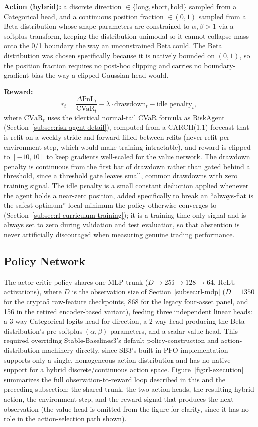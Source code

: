 \textbf{Action (hybrid):} a discrete direction $\in \{\text{long}, \text{short}, \text{hold}\}$ sampled from a Categorical head, and a continuous position fraction $\in (0,1)$ sampled from a Beta distribution whose shape parameters are constrained to $\alpha,\beta > 1$ via a softplus transform, keeping the distribution unimodal so it cannot collapse mass onto the 0/1 boundary the way an unconstrained Beta could. The Beta distribution was chosen specifically because it is natively bounded on $(0,1)$, so the position fraction requires no post-hoc clipping and carries no boundary-gradient bias the way a clipped Gaussian head would.

\textbf{Reward:}
\[
r_t = \frac{\Delta \mathrm{PnL}_t}{\mathrm{CVaR}_t} - \lambda \cdot \mathrm{drawdown}_t - \mathrm{idle\_penalty}_t,
\]
where $\mathrm{CVaR}_t$ uses the identical normal-tail CVaR formula as RiskAgent (Section~\ref{subsec:risk-agent-detail}), computed from a GARCH(1,1) forecast that is refit on a weekly stride and forward-filled between refits (never refit per environment step, which would make training intractable), and reward is clipped to $[-10, 10]$ to keep gradients well-scaled for the value network. The drawdown penalty is continuous from the first bar of drawdown rather than gated behind a threshold, since a threshold gate leaves small, common drawdowns with zero training signal. The idle penalty is a small constant deduction applied whenever the agent holds a near-zero position, added specifically to break an ``always-flat is the safest optimum'' local minimum the policy otherwise converges to (Section~\ref{subsec:rl-curriculum-training}); it is a training-time-only signal and is always set to zero during validation and test evaluation, so that abstention is never artificially discouraged when measuring genuine trading performance.

\subsection{Policy Network}
\label{subsec:rl-policy}

The actor-critic policy shares one MLP trunk ($D \to 256 \to 128 \to 64$, ReLU activations), where $D$ is the observation size of Section~\ref{subsec:rl-mdp} ($D=1350$ for the crypto5 raw-feature checkpoints, 868 for the legacy four-asset panel, and 156 in the retired encoder-based variant), feeding three independent linear heads: a 3-way Categorical logits head for direction, a 2-way head producing the Beta distribution's pre-softplus $(\alpha, \beta)$ parameters, and a scalar value head. This required overriding Stable-Baselines3's default policy-construction and action-distribution machinery directly, since SB3's built-in PPO implementation supports only a single, homogeneous action distribution and has no native support for a hybrid discrete/continuous action space. Figure~\ref{fig:rl-execution} summarizes the full observation-to-reward loop described in this and the preceding subsection: the shared trunk, the two action heads, the resulting hybrid action, the environment step, and the reward signal that produces the next observation (the value head is omitted from the figure for clarity, since it has no role in the action-selection path shown).

